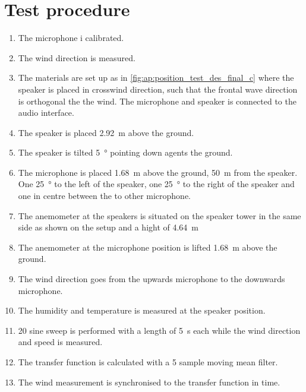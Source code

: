 


\section*{Test procedure}


\begin{enumerate}
\item The microphone i calibrated.
\item The wind direction is measured.
\item The materials are set up as in \autoref{fig:ap:position_test_des_final_c} where the speaker is placed in crosswind direction, such that the frontal wave direction is orthogonal the the wind. The microphone and speaker is connected to the audio interface.
\item The speaker is placed \SI{2.92}{\meter} above the ground.
\item The speaker is tilted \SI{5}{\degree} pointing down agents the ground.
\item The microphone is placed \SI{1.68}{\meter} above the ground, \SI{50}{\meter} from the speaker. One \SI{25}{\degree} to the left of the speaker, one \SI{25}{\degree} to the right of the speaker and one in centre between the to other microphone.
\item The anemometer at the speakers is situated on the speaker tower in the same side as shown on the setup and a hight of \SI{4.64}{\meter}
\item The anemometer at the microphone position is lifted \SI{1.68}{\meter} above the ground.
\item The wind direction goes from the upwards microphone to the downwards microphone.
\item The humidity and temperature is measured at the speaker position.
\item 20 sine sweep is performed with a length of \SI{5}{\second} each while the wind direction and speed is measured.
\item The transfer function is calculated with a 5 sample moving mean filter.
\item The wind measurement is synchronised to the transfer function in time. 

\end{enumerate}
